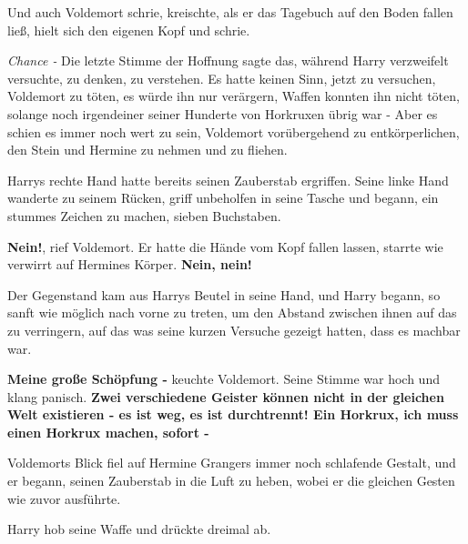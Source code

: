 Und auch Voldemort schrie, kreischte, als er das Tagebuch auf den Boden fallen
ließ, hielt sich den eigenen Kopf und schrie.

\emph{Chance -} Die letzte Stimme der Hoffnung sagte das, während Harry
verzweifelt versuchte, zu denken, zu verstehen. Es hatte keinen Sinn, jetzt zu
versuchen, Voldemort zu töten, es würde ihn nur verärgern, Waffen konnten ihn
nicht töten, solange noch irgendeiner seiner Hunderte von Horkruxen übrig war -
Aber es schien es immer noch wert zu sein, Voldemort vorübergehend zu
entkörperlichen, den Stein und Hermine zu nehmen und zu fliehen.

Harrys rechte Hand hatte bereits seinen Zauberstab ergriffen. Seine linke Hand
wanderte zu seinem Rücken, griff unbeholfen in seine Tasche und begann, ein
stummes Zeichen zu machen, sieben Buchstaben.

\glqq{}\textbf{Nein!}\grqq{}, rief Voldemort. Er hatte die Hände vom Kopf fallen
lassen, starrte wie verwirrt auf Hermines Körper. \glqq{}\textbf{Nein, nein!}\grqq{}

Der Gegenstand kam aus Harrys Beutel in seine Hand, und Harry begann, so sanft
wie möglich nach vorne zu treten, um den Abstand zwischen ihnen auf das zu
verringern, auf das was seine kurzen Versuche gezeigt hatten, dass es machbar
war.

\glqq{}\textbf{Meine große Schöpfung -}\grqq{} keuchte Voldemort. Seine Stimme
war hoch und klang panisch. \glqq{}\textbf{Zwei verschiedene Geister können nicht
in der gleichen Welt existieren - es ist weg, es ist durchtrennt! Ein Horkrux,
ich muss einen Horkrux machen, sofort -}\grqq{}

Voldemorts Blick fiel auf Hermine Grangers immer noch schlafende Gestalt, und er
begann, seinen Zauberstab in die Luft zu heben, wobei er die gleichen Gesten wie
zuvor ausführte.

Harry hob seine Waffe und drückte dreimal ab.

